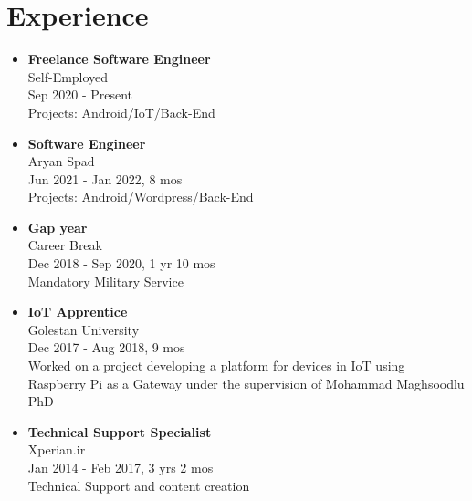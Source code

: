 \section*{\LARGE{Experience}}
\begin{itemize}
    \item \large{\textbf{Freelance Software Engineer}\\Self-Employed\\}\normalsize{Sep 2020 - Present\\Projects: Android/IoT/Back-End}
    \item \large{\textbf{Software Engineer}\\Aryan Spad\\}\normalsize{Jun 2021 - Jan 2022, 8 mos\\Projects: Android/Wordpress/Back-End}
    \item \large{\textbf{Gap year}\\Career Break\\}\normalsize{Dec 2018 - Sep 2020}, 1 yr 10 mos\\ Mandatory Military Service
    \item \large{\textbf{IoT Apprentice}\\Golestan University\\}\normalsize{Dec 2017 - Aug 2018, 9 mos\\Worked on a project developing a platform for devices in IoT using Raspberry Pi as a Gateway under the supervision of Mohammad Maghsoodlu PhD}
    \item \large{\textbf{Technical Support Specialist}\\Xperian.ir\\}\normalsize{Jan 2014 - Feb 2017, 3 yrs 2 mos\\Technical Support and content creation}
\end{itemize}
